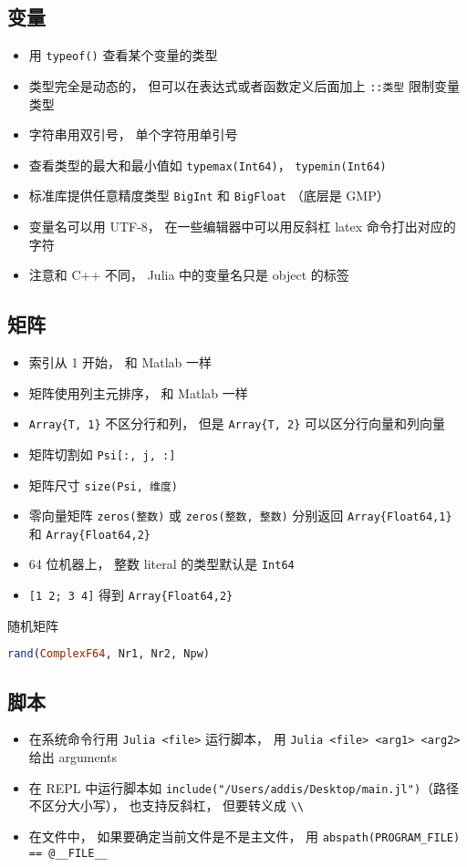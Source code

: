 \subsection{变量}
\begin{itemize}
\item 用 \verb|typeof()| 查看某个变量的类型
\item 类型完全是动态的， 但可以在表达式或者函数定义后面加上 \verb|::类型| 限制变量类型
\item 字符串用双引号， 单个字符用单引号
\item 查看类型的最大和最小值如 \verb|typemax(Int64)|， \verb|typemin(Int64)|
\item 标准库提供任意精度类型 \verb|BigInt| 和 \verb|BigFloat| （底层是 GMP）
\item 变量名可以用 UTF-8， 在一些编辑器中可以用反斜杠 latex 命令打出对应的字符
\item 注意和 C++ 不同， Julia 中的变量名只是 object 的标签
\end{itemize}

\subsection{矩阵}
\begin{itemize}
\item 索引从 1 开始， 和 Matlab 一样
\item 矩阵使用列主元排序， 和 Matlab 一样
\item \verb|Array{T, 1}| 不区分行和列， 但是 \verb|Array{T, 2}| 可以区分行向量和列向量
\item 矩阵切割如 \verb|Psi[:, j, :]|
\item 矩阵尺寸 \verb|size(Psi, 维度)|
\item 零向量矩阵 \verb|zeros(整数)| 或 \verb|zeros(整数, 整数)| 分别返回 \verb|Array{Float64,1}| 和 \verb|Array{Float64,2}|
\item 64 位机器上， 整数 literal 的类型默认是 \verb|Int64|
\item \verb|[1 2; 3 4]| 得到 \verb|Array{Float64,2}|
\end{itemize}

随机矩阵
\begin{lstlisting}[language=Julia]
rand(ComplexF64, Nr1, Nr2, Npw)
\end{lstlisting}

\subsection{脚本}
\begin{itemize}
\item 在系统命令行用 \verb|Julia <file>| 运行脚本， 用 \verb|Julia <file> <arg1> <arg2>| 给出 arguments
\item 在 REPL 中运行脚本如 \verb|include("/Users/addis/Desktop/main.jl")|（路径不区分大小写）， 也支持反斜杠， 但要转义成 \verb|\\|
\item 在文件中， 如果要确定当前文件是不是主文件， 用 \verb|abspath(PROGRAM_FILE) == @__FILE__|
\end{itemize}

